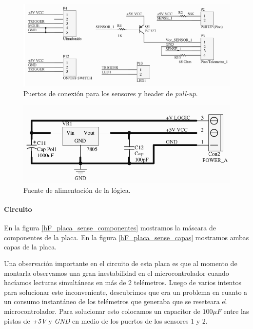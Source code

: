 \begin{figure}
	\centering
	\includegraphics[scale=.28]{figuras/sense_schemaSensor.png}
	\caption{Puertos de conexi\'on para los sensores y header de \emph{pull-up}.}
	\label{hF_placa_sense_schema3}
\end{figure}

\begin{figure}
	\centering
	\includegraphics[scale=.22]{figuras/sense_schemaFuente.png}
	\caption{Fuente de alimentaci\'on de la l\'ogica.}
	\label{hF_placa_sense_schema4}
\end{figure}

\paragraph{Circuito}
\label{h_placas_sensado_circuito}

En la figura \ref{hF_placa_sense_componentes} mostramos la m\'ascara de componentes de la placa.
En la figura \ref{hF_placa_sense_capas} mostramos ambas capas de la placa.

Una observaci\'on importante en el circuito de esta placa es que al momento de montarla
observamos una gran inestabilidad en el microcontrolador cuando hac\'iamos lecturas simult\'aneas
en m\'as de 2 tel\'emetros.
Luego de varios intentos para solucionar este inconveniente, descubrimos que era un problema
en cuanto a un consumo instant\'aneo de los tel\'emetros que generaba que se reseteara el
microcontrolador.
Para solucionar esto colocamos un capacitor de $100\mu F$ entre las pistas de \emph{+5V} y
\emph{GND} en medio de los puertos de los sensores 1 y 2.

